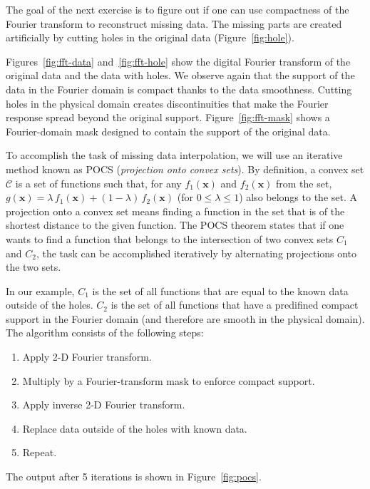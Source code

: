 
The goal of the next exercise is to figure out if one can use compactness
of the Fourier transform to reconstruct missing data. The missing
parts are created artificially by cutting holes in the original data
(Figure~\ref{fig:hole}).



Figures~\ref{fig:fft-data} and~\ref{fig:fft-hole} show the digital
Fourier transform of the original data and the data with holes. We
observe again that the support of the data in the Fourier domain is
compact thanks to the data smoothness. Cutting holes in the physical
domain creates discontinuities that make the Fourier response spread
beyond the original support. Figure~\ref{fig:fft-mask} shows a
Fourier-domain mask designed to contain the support of the original
data.

To accomplish the task of missing data interpolation, we will use an
iterative method known as POCS (\emph{projection onto convex
sets}). By definition, a convex set $\mathcal{C}$ is a set of
functions such that, for any $f_1(\mathbf{x})$ and $f_2(\mathbf{x})$
from the set, $g(\mathbf{x}) = \lambda\,f_1(\mathbf{x}) +
(1-\lambda)\,f_2(\mathbf{x})$ (for $0 \le \lambda \le 1$) also belongs
to the set. A projection onto a convex set means finding a function in
the set that is of the shortest distance to the given function. The
POCS theorem states that if one wants to find a function that belongs
to the intersection of two convex sets $C_1$ and $C_2$, the task can
be accomplished iteratively by alternating projections onto the two
sets.

In our example, $C_1$ is the set of all functions that are equal to
the known data outside of the holes. $C_2$ is the set of all functions
that have a predifined compact support in the Fourier domain (and
therefore are smooth in the physical domain). The algorithm consists
of the following steps:
\begin{enumerate}
\item Apply 2-D Fourier transform. 
\item Multiply by a Fourier-transform mask to enforce compact support.
\item Apply inverse 2-D Fourier transform.
\item Replace data outside of the holes with known data.
\item Repeat.
\end{enumerate}
The output after 5 iterations is shown in Figure~\ref{fig:pocs}.

